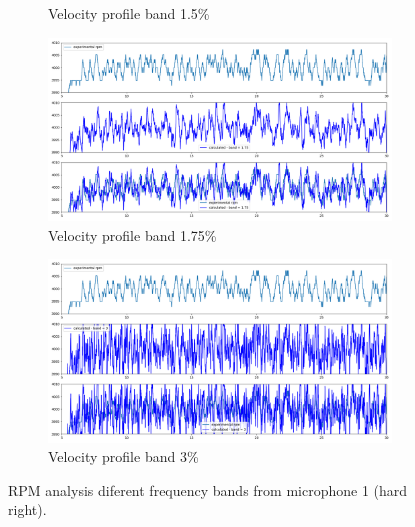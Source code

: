 \documentclass[10pt,fleqn,a4paper,twoside]{article}
\begin{document}
\begin{figure}
\begin{subfigure}{0.4\textwidth}
        \caption{Velocity profile band 1.5\%}
        \label{fig:sixth}
    \end{subfigure}
    \centering
    \hfill
    \begin{subfigure}{0.4\textwidth}
        \includegraphics[width=\textwidth]{Figures/rpm_analysis_mic0_band_1.75.png}
        \caption{Velocity profile band 1.75\%}
        \label{fig:seventh}
    \end{subfigure}
    \centering
    \hfill 
    \begin{subfigure}{0.4\textwidth}
        \includegraphics[width=\textwidth]{Figures/rpm_analysis_mic0_band_3.png}
        \caption{Velocity profile band 3\%}
        \label{fig:eigth}
    \end{subfigure}
            
    \caption{RPM analysis diferent frequency bands from microphone 1 (hard right).}
    \label{fig:figures}
    \end{figure}
\end{document}
